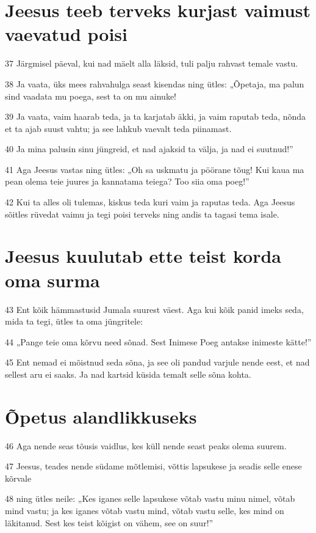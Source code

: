 \section*{Jeesus teeb terveks kurjast vaimust vaevatud poisi}

\par 37 Järgmisel päeval, kui nad mäelt alla läksid, tuli palju rahvast temale vastu.
\par 38 Ja vaata, üks mees rahvahulga seast kisendas ning ütles: „Õpetaja, ma palun sind vaadata mu poega, sest ta on mu ainuke!
\par 39 Ja vaata, vaim haarab teda, ja ta karjatab äkki, ja vaim raputab teda, nõnda et ta ajab suust vahtu; ja see lahkub vaevalt teda piinamast.
\par 40 Ja mina palusin sinu jüngreid, et nad ajaksid ta välja, ja nad ei suutnud!”
\par 41 Aga Jeesus vastas ning ütles: „Oh sa uskmatu ja pöörane tõug! Kui kaua ma pean olema teie juures ja kannatama teiega? Too siia oma poeg!”
\par 42 Kui ta alles oli tulemas, kiskus teda kuri vaim ja raputas teda. Aga Jeesus sõitles rüvedat vaimu ja tegi poisi terveks ning andis ta tagasi tema isale.

\section*{Jeesus kuulutab ette teist korda oma surma}

\par 43 Ent kõik hämmastusid Jumala suurest väest. Aga kui kõik panid imeks seda, mida ta tegi, ütles ta oma jüngritele:
\par 44 „Pange teie oma kõrvu need sõnad. Sest Inimese Poeg antakse inimeste kätte!”
\par 45 Ent nemad ei mõistnud seda sõna, ja see oli pandud varjule nende eest, et nad sellest aru ei saaks. Ja nad kartsid küsida temalt selle sõna kohta.

\section*{Õpetus alandlikkuseks}

\par 46 Aga nende seas tõusis vaidlus, kes küll nende seast peaks olema suurem.
\par 47 Jeesus, teades nende südame mõtlemisi, võttis lapsukese ja seadis selle enese kõrvale
\par 48 ning ütles neile: „Kes iganes selle lapsukese võtab vastu minu nimel, võtab mind vastu; ja kes iganes võtab vastu mind, võtab vastu selle, kes mind on läkitanud. Sest kes teist kõigist on vähem, see on suur!”

